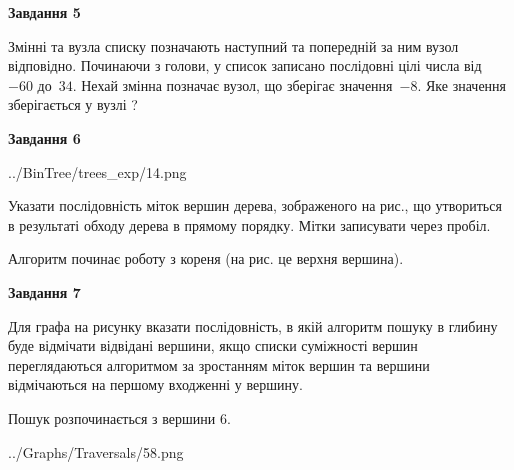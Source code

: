 \documentclass[12pt, ukrainian]{article}
\begin{document}
{\begin {large}
{\begin {center}\textbf{Завдання 5}\end {center}}\par
Змінні  та  вузла списку позначають наступний та попередній за ним вузол відповідно. Починаючи з голови, у список записано послідовні цілі числа від~$-60$ до~$34$. Нехай змінна  позначає вузол, що зберігає значення~$-8$.
Яке значення зберігається у вузлі  ?\par
\newpage

{\begin {center}\textbf{Завдання 6}\end {center}}\par

\begin{center}
	{../BinTree/trees_exp/14.png}
\end{center}
Указати послідовність міток вершин дерева, зображеного на рис., що утвориться в результаті обходу дерева в прямому порядку. Мітки записувати через пробіл.\par Алгоритм починає роботу з кореня (на рис. це верхня вершина).\par
\newpage

{\begin {center}\textbf{Завдання 7}\end {center}}\par
Для графа на рисунку вказати послідовність, в якій алгоритм пошуку в глибину буде відмічати відвідані вершини, якщо списки суміжності вершин переглядаються алгоритмом за зростанням міток вершин та вершини відмічаються на першому вход\-женні у вершину.\par
Пошук розпочинається з вершини 6.\par

\begin{center}
	{../Graphs/Traversals/58.png}
\end{center}\par
\newpage


\end{large}}
\end{document}
